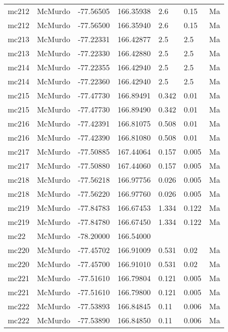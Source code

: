 \documentclass{article}
\begin{document}
\begin{longtable}{llrrlll}
 mc212 &  McMurdo & -77.56505 &  166.35938 &     2.6 &      0.15 &    Ma \\
 mc212 &  McMurdo & -77.56500 &  166.35940 &     2.6 &      0.15 &    Ma \\
 mc213 &  McMurdo & -77.22331 &  166.42877 &     2.5 &       2.5 &    Ma \\
 mc213 &  McMurdo & -77.22330 &  166.42880 &     2.5 &       2.5 &    Ma \\
 mc214 &  McMurdo & -77.22355 &  166.42940 &     2.5 &       2.5 &    Ma \\
 mc214 &  McMurdo & -77.22360 &  166.42940 &     2.5 &       2.5 &    Ma \\
 mc215 &  McMurdo & -77.47730 &  166.89491 &   0.342 &      0.01 &    Ma \\
 mc215 &  McMurdo & -77.47730 &  166.89490 &   0.342 &      0.01 &    Ma \\
 mc216 &  McMurdo & -77.42391 &  166.81075 &   0.508 &      0.01 &    Ma \\
 mc216 &  McMurdo & -77.42390 &  166.81080 &   0.508 &      0.01 &    Ma \\
 mc217 &  McMurdo & -77.50885 &  167.44064 &   0.157 &     0.005 &    Ma \\
 mc217 &  McMurdo & -77.50880 &  167.44060 &   0.157 &     0.005 &    Ma \\
 mc218 &  McMurdo & -77.56218 &  166.97756 &   0.026 &     0.005 &    Ma \\
 mc218 &  McMurdo & -77.56220 &  166.97760 &   0.026 &     0.005 &    Ma \\
 mc219 &  McMurdo & -77.84783 &  166.67453 &   1.334 &     0.122 &    Ma \\
 mc219 &  McMurdo & -77.84780 &  166.67450 &   1.334 &     0.122 &    Ma \\
  mc22 &  McMurdo & -78.20000 &  166.54000 &         &           &       \\
 mc220 &  McMurdo & -77.45702 &  166.91009 &   0.531 &      0.02 &    Ma \\
 mc220 &  McMurdo & -77.45700 &  166.91010 &   0.531 &      0.02 &    Ma \\
 mc221 &  McMurdo & -77.51610 &  166.79804 &   0.121 &     0.005 &    Ma \\
 mc221 &  McMurdo & -77.51610 &  166.79800 &   0.121 &     0.005 &    Ma \\
 mc222 &  McMurdo & -77.53893 &  166.84845 &    0.11 &     0.006 &    Ma \\
 mc222 &  McMurdo & -77.53890 &  166.84850 &    0.11 &     0.006 &    Ma \\

\end{longtable}
\end{document}
